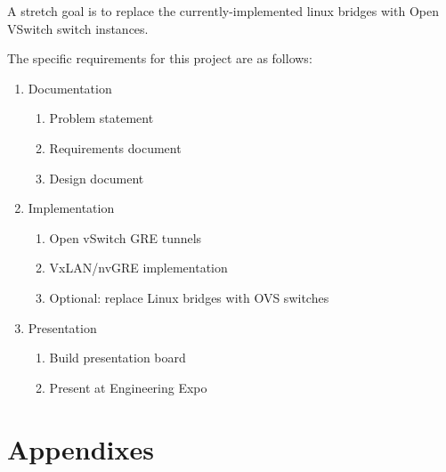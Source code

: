 \documentclass[10pt,letterpaper,onecolumn,draftclsnofoot]{IEEEtran}
\begin{document}
A stretch goal is to replace the currently-implemented linux bridges with
Open VSwitch switch instances.

The specific requirements for this project are as follows:

\begin{enumerate}
	\item Documentation
		\begin{enumerate}
			\item Problem statement
			\item Requirements document
			\item Design document
		\end{enumerate}
	\item Implementation
		\begin{enumerate}
			\item Open vSwitch GRE tunnels
			\item VxLAN/nvGRE implementation
			\item Optional: replace Linux bridges with OVS switches
		\end{enumerate}
	\item Presentation
		\begin{enumerate}
			\item Build presentation board
			\item Present at Engineering Expo
		\end{enumerate}
\end{enumerate}

\clearpage
\section{Appendixes}
\end{document}
